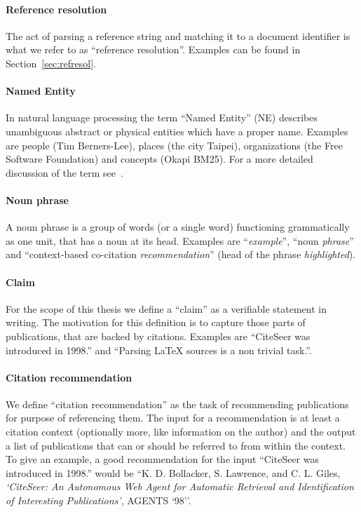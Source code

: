 \paragraph{Reference resolution} The act of parsing a reference string and matching it to a document identifier is what we refer to as ``reference resolution''. Examples can be found in Section~\ref{sec:refresol}.
\paragraph{Named Entity} In natural language processing the term ``Named Entity'' (NE) describes unambiguous abstract or physical entities which have a proper name. Examples are people (Tim Berners-Lee), places (the city Taipei), organizations (the Free Software Foundation) and concepts (Okapi BM25). For a more detailed discussion of the term see~\cite{Nadeau2007}.
\paragraph{Noun phrase} A noun phrase is a group of words (or a single word) functioning grammatically as one unit, that has a noun at its head. Examples are ``\emph{example}'', ``noun \emph{phrase}'' and ``context-based co-citation \emph{recommendation}'' (head of the phrase \emph{highlighted}).
\paragraph{Claim} For the scope of this thesis we define a ``claim'' as a verifiable statement in writing. The motivation for this definition is to capture those parts of publications, that are backed by citations. Examples are ``CiteSeer was introduced in 1998.'' and ``Parsing \LaTeX{} sources is a non trivial task.''.
\paragraph{Citation recommendation} We define ``citation recommendation'' as the task of recommending publications for purpose of referencing them. The input for a recommendation is at least a citation context (optionally more, like information on the author) and the output a list of publications that can or should be referred to from within the context. To give an example, a good recommendation for the input ``CiteSeer was introduced in 1998.'' would be ``K. D. Bollacker, S. Lawrence, and C. L. Giles, \emph{`CiteSeer: An Autonomous Web Agent for Automatic Retrieval and Identification of Interesting Publications'}, AGENTS `98''.

